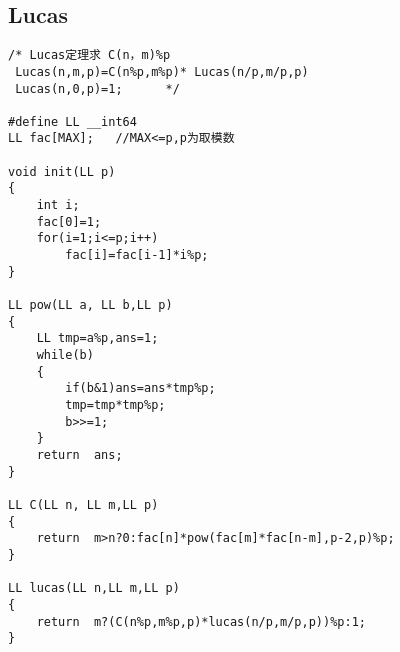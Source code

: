 \subsection{Lucas   }
    \begin{verbatim}
/* Lucas定理求 C(n，m)%p
 Lucas(n,m,p)=C(n%p,m%p)* Lucas(n/p,m/p,p)
 Lucas(n,0,p)=1;      */

#define LL __int64
LL fac[MAX];   //MAX<=p,p为取模数

void init(LL p)
{
    int i;
    fac[0]=1;
    for(i=1;i<=p;i++)
        fac[i]=fac[i-1]*i%p;
}

LL pow(LL a, LL b,LL p)
{
    LL tmp=a%p,ans=1;
    while(b)
    {
        if(b&1)ans=ans*tmp%p;
        tmp=tmp*tmp%p;
        b>>=1;
    }
    return  ans;
}

LL C(LL n, LL m,LL p)
{
    return  m>n?0:fac[n]*pow(fac[m]*fac[n-m],p-2,p)%p;
}

LL lucas(LL n,LL m,LL p)
{
    return  m?(C(n%p,m%p,p)*lucas(n/p,m/p,p))%p:1;
}
	\end{verbatim}
